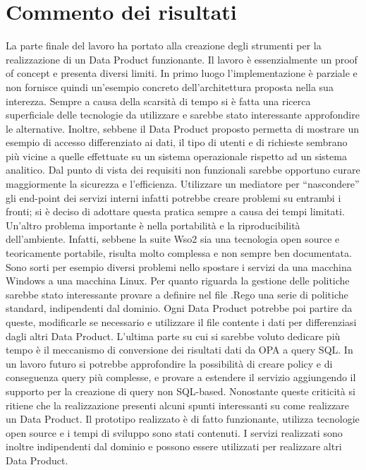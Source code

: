 \documentclass[12pt]{report}
\begin{document}
\section{Commento dei risultati}
La parte finale del lavoro ha portato alla creazione degli strumenti per la realizzazione di un Data Product funzionante.
Il lavoro è essenzialmente un proof of concept e presenta diversi limiti.
In primo luogo l'implementazione è parziale e non fornisce quindi un'esempio concreto dell'architettura proposta nella sua interezza.
Sempre a causa della scarsità di tempo si è fatta una ricerca superficiale delle tecnologie da utilizzare e sarebbe stato interessante approfondire le alternative.
Inoltre, sebbene il Data Product proposto permetta di mostrare un esempio di accesso differenziato ai dati, il tipo di utenti e di richieste sembrano più vicine a quelle effettuate su un sistema operazionale rispetto ad un sistema analitico.
Dal punto di vista dei requisiti non funzionali sarebbe opportuno curare maggiormente la sicurezza e l'efficienza. 
Utilizzare un mediatore per ``nascondere'' gli end-point dei servizi interni infatti potrebbe creare problemi su entrambi i fronti; si è deciso di adottare questa pratica sempre a causa dei tempi limitati.
Un'altro problema importante è nella portabilità e la riproducibilità dell'ambiente. 
Infatti, sebbene la suite Wso2 sia una tecnologia open source e teoricamente portabile, risulta molto complessa e non sempre ben documentata. 
Sono sorti per esempio diversi problemi nello spostare i servizi da una macchina Windows a una macchina Linux.
Per quanto riguarda la gestione delle politiche sarebbe stato interessante provare a definire nel file .Rego una serie di politiche standard, indipendenti dal dominio.
Ogni Data Product potrebbe poi partire da queste, modificarle se necessario e utilizzare il file contente i dati per differenziasi dagli altri Data Product.
L'ultima parte su cui si sarebbe voluto dedicare più tempo è il meccanismo di conversione dei risultati dati da OPA a query SQL.
In un lavoro futuro si potrebbe approfondire la possibilità di creare policy e di conseguenza query più complesse, e provare a estendere il servizio aggiungendo il supporto per la creazione di query non SQL-based.
Nonostante queste criticità si ritiene che la realizzazione presenti alcuni spunti interessanti su come realizzare un Data Product.
Il prototipo realizzato è di fatto funzionante, utilizza tecnologie open source e i tempi di sviluppo sono stati contenuti.
I servizi realizzati sono inoltre indipendenti dal dominio e possono essere utilizzati per realizzare altri Data Product.
\end{document}
